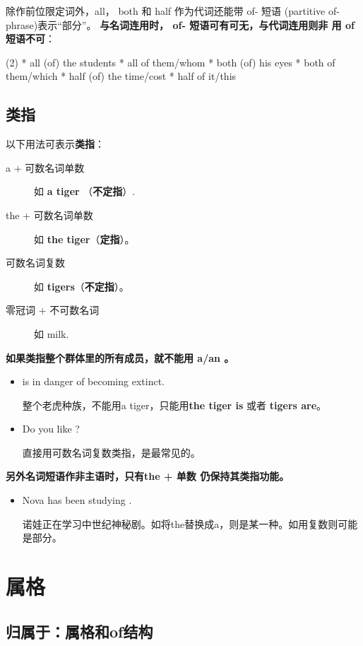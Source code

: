 除作前位限定词外，all， both 和 half 作为代词还能带 of- 短语 (partitive
of-phrase)表示“部分”。 \textbf{与名词连用时， of- 短语可有可无，与代词连用则非
  用 of短语不可}：
\begin{taskitem}(2)
  * all (of) the students
  * all of them/whom
  * both (of) his eyes
  * both of them/which
  * half (of) the time/cost
  * half of it/this
\end{taskitem}


\subsection{类指}

以下用法可表示\textbf{类指}：
\begin{description}
\item[a + 可数名词单数] 如 \textbf{a tiger} （\textbf{不定指}）.
\item[the + 可数名词单数] 如 \textbf{the tiger}（\textbf{定指}）。
\item[可数名词复数] 如 \textbf{tigers}（\textbf{不定指}）。
\item[零冠词 + 不可数名词] 如 milk.
\end{description}

\textbf{如果类指整个群体里的所有成员，就不能用 a/an 。}
\begin{itemize}
\item {} is in danger of becoming extinct.

  整个老虎种族，不能用a tiger，只能用\textbf{the tiger is} 或者 \textbf{tigers are}。

\item Do you like ?

  直接用可数名词复数类指，是最常见的。
\end{itemize}

\textbf{另外名词短语作非主语时，只有the + 单数 仍保持其类指功能。}
\begin{itemize}
\item Nova has been studying .

  诺娃正在学习中世纪神秘剧。如将the替换成a，则是某一种。如用复数则可能是部分。
\end{itemize}

\section{属格}

\subsection{归属于：属格和of结构}

